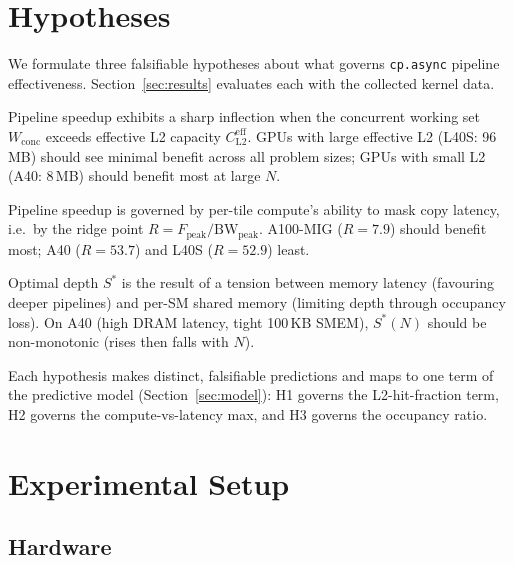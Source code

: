 \documentclass[10pt,twocolumn]{article}
\newcommand{\cpasync}{\texttt{cp.async}}
\newcommand{\wconc}{W_{\text{conc}}}
\newcommand{\cleff}{C_{\text{L2}}^{\text{eff}}}
\begin{document}
\section{Hypotheses}
\label{sec:hypotheses}

We formulate three falsifiable hypotheses about what governs
\cpasync{} pipeline effectiveness.  Section~\ref{sec:results}
evaluates each with the collected kernel data.

\begin{description}[leftmargin=0pt, itemsep=4pt]
\item[\textbf{H1 (L2-capacity-driven).}]
  Pipeline speedup exhibits a sharp inflection when the concurrent
  working set $\wconc$ exceeds effective L2 capacity $\cleff$.
  GPUs with large effective L2 (L40S: 96\,MB) should see minimal
  benefit across all problem sizes; GPUs with small L2
  (A40: 8\,MB) should benefit most at large $N$.
\item[\textbf{H2 (Ridge-point-driven).}]
  Pipeline speedup is governed by per-tile compute's ability to mask
  copy latency, i.e.\ by the ridge point
  $R = F_{\text{peak}} / \text{BW}_{\text{peak}}$.  A100-MIG
  ($R = 7.9$) should benefit most; A40 ($R = 53.7$) and L40S
  ($R = 52.9$) least.
\item[\textbf{H3 (Latency--occupancy tension).}]
  Optimal depth $S^*$ is the result of a tension between memory
  latency (favouring deeper pipelines) and per-SM shared memory
  (limiting depth through occupancy loss).  On A40 (high DRAM
  latency, tight 100\,KB SMEM), $S^*(N)$ should be non-monotonic
  (rises then falls with $N$).
\end{description}

\noindent Each hypothesis makes distinct, falsifiable predictions
and maps to one term of the predictive model
(Section~\ref{sec:model}): H1 governs the L2-hit-fraction term, H2
governs the compute-vs-latency max, and H3 governs the occupancy
ratio.

\section{Experimental Setup}
\label{sec:setup}

\subsection{Hardware}
\end{document}
